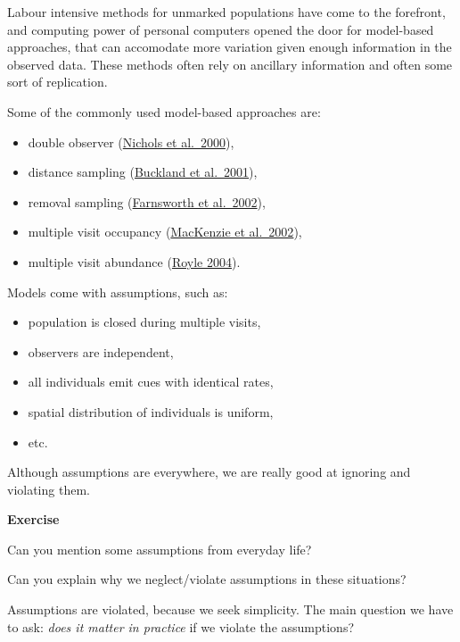 \documentclass[12pt,]{book}
\providecommand{\tightlist}{%
  \setlength{\itemsep}{0pt}\setlength{\parskip}{0pt}}
\let\BeginKnitrBlock\begin \let\EndKnitrBlock\end
\begin{document}
Labour intensive methods for unmarked populations
have come to the forefront, and computing power of
personal computers opened the door for model-based approaches,
that can accomodate more variation given enough information
in the observed data. These methods often rely on ancillary
information and often some sort of replication.

Some of the commonly used model-based approaches are:

\begin{itemize}
\tightlist
\item
  double observer (\href{https://doi.org/10.1642/0004-8038(2000)117\%5B0393:ADOAFE\%5D2.0.CO;2}{Nichols et al.~2000}),
\item
  distance sampling (\href{https://global.oup.com/academic/product/introduction-to-distance-sampling-9780198509271}{Buckland et al.~2001}),
\item
  removal sampling (\href{https://doi.org/10.1642/0004-8038(2002)119\%5B0414:ARMFED\%5D2.0.CO;2}{Farnsworth et al.~2002}),
\item
  multiple visit occupancy (\href{https://doi.org/10.1890/0012-9658(2002)083\%5B2248:ESORWD\%5D2.0.CO;2}{MacKenzie et al.~2002}),
\item
  multiple visit abundance (\href{https://doi.org/10.1111/j.0006-341X.2004.00142.x}{Royle 2004}).
\end{itemize}

Models come with assumptions, such as:

\begin{itemize}
\tightlist
\item
  population is closed during multiple visits,
\item
  observers are independent,
\item
  all individuals emit cues with identical rates,
\item
  spatial distribution of individuals is uniform,
\item
  etc.
\end{itemize}

Although assumptions are everywhere, we are really good at ignoring
and violating them.

\BeginKnitrBlock{rmdexercise}
\textbf{Exercise}

Can you mention some assumptions from everyday life?

Can you explain why we neglect/violate assumptions in these situations?
\EndKnitrBlock{rmdexercise}

Assumptions are violated, because we seek simplicity.
The main question we have to ask: \emph{does it matter in practice} if
we violate the assumptions?
\end{document}
